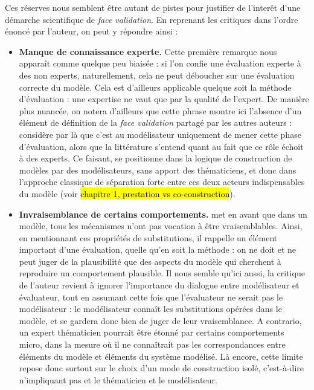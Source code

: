 Ces réserves nous semblent être autant de pistes pour justifier de l'interêt d'une démarche scientifique de \textit{face validation}. En reprenant les critiques dans l'ordre énoncé par l'auteur, on peut y répondre ainsi :
\begin{itemize}
	\item \textbf{Manque de connaissance experte.}
	Cette première remarque nous apparaît comme quelque peu biaisée : si l'on confie une évaluation experte à des non experts, naturellement, cela ne peut déboucher sur une évaluation correcte du modèle.
	Cela est d'ailleurs applicable quelque soit la méthode d'évaluation : une expertise ne vaut que par la qualité de l'expert.
	De manière plus nuancée, on notera d'ailleurs que cette phrase montre ici l'absence d'un élément de définition de la \textit{face validation} partagé par les autres auteurs :
	\citeauthor{hermann_validation_1967} considère par là que c'est au modélisateur uniquement de mener cette phase d'évaluation, alors que la littérature s'entend quant au fait que ce rôle échoit à des experts.
	Ce faisant, \citeauthor{hermann_validation_1967} se positionne dans la logique de construction de modèles par des modélisateurs, sans apport des thématiciens, et donc dans l'approche classique de séparation forte entre ces deux acteurs indispensables du modèle (voir \hl{chapitre 1, prestation vs co-construction}).
	
	\item \textbf{Invraisemblance de certains comportements.}
	\citeauthor{hermann_validation_1967} met en avant que dans un modèle, tous les mécanismes n'ont pas vocation à être vraisemblables.
	Ainsi, en mentionnant ces \og propriétés de substitutions\fg{}, il rappelle un élément important d'une évaluation, quelle qu'en soit la méthode :
	on ne doit et ne peut juger de la plausibilité que des aspects du modèle qui cherchent à reproduire un comportement plausible.
	Il nous semble qu'ici aussi, la critique de l'auteur revient à ignorer l'importance du dialogue entre modélisateur et évaluateur, tout en assumant cette fois que l'évaluateur ne serait pas le modélisateur :
	le modélisateur connaît les \og substitutions\fg{} opérées dans le modèle, et se gardera donc bien de juger de leur vraisemblance.
	A contrario, un expert thématicien pourrait être étonné par certains comportements micro, dans la mesure où il ne connaîtrait pas les correspondances entre éléments du modèle et éléments du système modélisé.
	Là encore, cette limite repose donc surtout sur le choix d'un mode de construction isolé, c'est-à-dire n'impliquant pas et le thématicien et le modélisateur.
	

\end{itemize}
